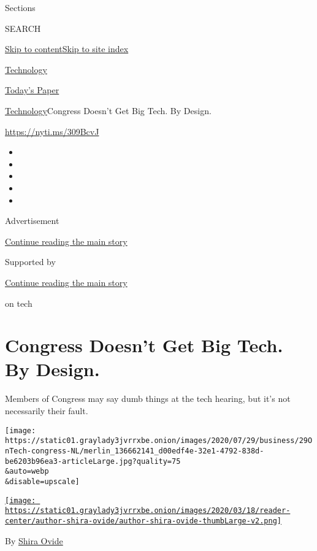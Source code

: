 Sections

SEARCH

\protect\hyperlink{site-content}{Skip to
content}\protect\hyperlink{site-index}{Skip to site index}

\href{https://www.nytimes3xbfgragh.onion/section/technology}{Technology}

\href{https://myaccount.nytimes3xbfgragh.onion/auth/login?response_type=cookie\&client_id=vi}{}

\href{https://www.nytimes3xbfgragh.onion/section/todayspaper}{Today's
Paper}

\href{/section/technology}{Technology}\textbar{}Congress Doesn't Get Big
Tech. By Design.

\href{https://nyti.ms/309BcvJ}{https://nyti.ms/309BcvJ}

\begin{itemize}
\item
\item
\item
\item
\item
\end{itemize}

Advertisement

\protect\hyperlink{after-top}{Continue reading the main story}

Supported by

\protect\hyperlink{after-sponsor}{Continue reading the main story}

on tech

\hypertarget{congress-doesnt-get-big-tech-by-design}{%
\section{Congress Doesn't Get Big Tech. By
Design.}\label{congress-doesnt-get-big-tech-by-design}}

Members of Congress may say dumb things at the tech hearing, but it's
not necessarily their fault.

\texttt{[image: https://static01.graylady3jvrrxbe.onion/images/2020/07/29/business/29OnTech-congress-NL/merlin\_136662141\_d00edf4e-32e1-4792-838d-be6203b96ea3-articleLarge.jpg?quality=75\\\&auto=webp\\\&disable=upscale]}

\href{https://www.nytimes3xbfgragh.onion/by/shira-ovide}{\texttt{[image: https://static01.graylady3jvrrxbe.onion/images/2020/03/18/reader-center/author-shira-ovide/author-shira-ovide-thumbLarge-v2.png]}}

By \href{https://www.nytimes3xbfgragh.onion/by/shira-ovide}{Shira Ovide}

